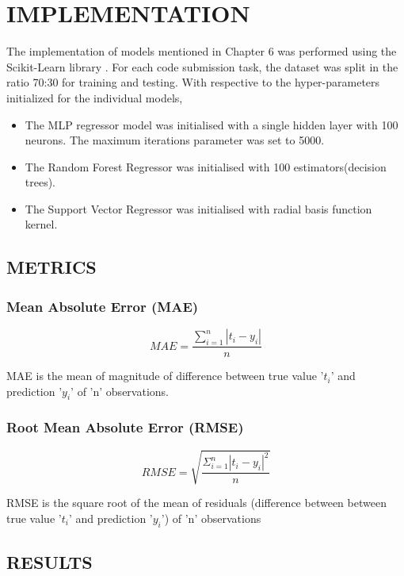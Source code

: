 \chapter{IMPLEMENTATION}

The implementation of models mentioned in Chapter 6 was performed using the Scikit-Learn library \cite{E}. For each code submission task, the dataset was split in the ratio 70:30 for training and testing. With respective to the hyper-parameters initialized for the individual models, 

\begin{itemize}
    \item The MLP regressor model was initialised with a single hidden layer with 100 neurons. The maximum iterations parameter was set to 5000. 
    \item The Random Forest Regressor was initialised with 100 estimators(decision trees).
    \item The Support Vector Regressor was initialised with radial basis function kernel.
\end{itemize} 


\section{METRICS}
 

\subsection{Mean Absolute Error (MAE)}

\[ MAE = \frac{\sum_{i=1}^{n}|t_i-y_i|}{n} \]

MAE is the mean of magnitude of difference between true value '$t_{i}$' and prediction '$y_{i}$' of 'n' observations.

\subsection{Root Mean Absolute Error (RMSE)}

\[ RMSE = \sqrt{\frac{\Sigma_{i=1}^{n}{|t_i-y_i|}^2}{n}} \]

RMSE is the square root of the mean of residuals (difference between between true value '$t_{i}$' and prediction '$y_{i}$') of 'n' observations 

\section{RESULTS}

